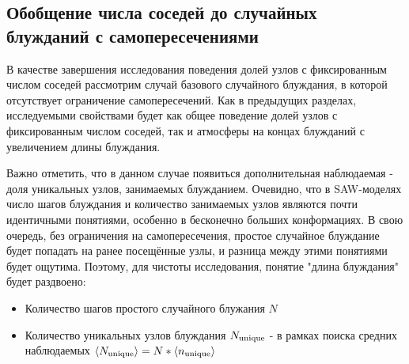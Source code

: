 \subsection{Обобщение числа соседей до случайных блужданий с самопересечениями}

В качестве завершения исследования поведения долей узлов с фиксированным числом соседей рассмотрим случай базового случайного блуждания, в которой отсутствует ограничение самопересечений. Как в предыдущих разделах, исследуемыми свойствами будет как общее поведение долей узлов с фиксированным числом соседей, так и атмосферы на концах блужданий с увеличением длины блуждания. 

Важно отметить, что в данном случае появиться дополнительная наблюдаемая - доля уникальных узлов, занимаемых блужданием. Очевидно, что в SAW-моделях число шагов блуждания и количество занимаемых узлов являются почти идентичными понятиями, особенно в бесконечно больших конформациях. В свою очередь, без ограничения на самопересечения, простое случайное блуждание будет попадать на ранее посещённые узлы, и разница между этими понятиями будет ощутима. Поэтому, для чистоты исследования, понятие "длина блуждания" будет раздвоено:

\begin{itemize}
\item Количество шагов простого случайного блужания $N$
\item Количество уникальных узлов блуждания $N_{\textup{unique}}$ - в рамках поиска средних наблюдаемых $\langle N_{\textup{unique}} \rangle = N * \langle n_{\textup{unique}} \rangle$ 
\end{itemize}

